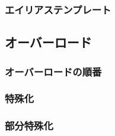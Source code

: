 \subsubsection*{エイリアステンプレート}

\subsection{オーバーロード}

\subsubsection{オーバーロードの順番}

\subsubsection{特殊化}

\subsubsection{部分特殊化}
